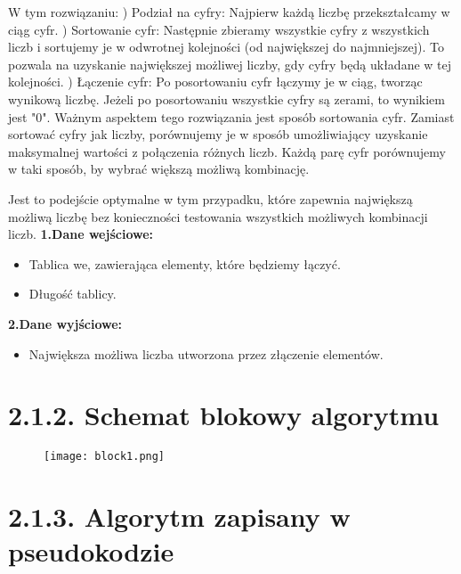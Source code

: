 \documentclass[a4paper,12pt]{article}
\begin{document}
	W tym rozwiązaniu:
	) Podział na cyfry: Najpierw każdą liczbę przekształcamy w ciąg cyfr.
	) Sortowanie cyfr: Następnie zbieramy wszystkie cyfry z wszystkich liczb i sortujemy je w odwrotnej kolejności (od największej do najmniejszej). To pozwala na uzyskanie największej możliwej liczby, gdy cyfry będą układane w tej kolejności.
	) Łączenie cyfr: Po posortowaniu cyfr łączymy je w ciąg, tworząc wynikową liczbę. Jeżeli po posortowaniu wszystkie cyfry są zerami, to wynikiem jest "0".
	\newline
	Ważnym aspektem tego rozwiązania jest sposób sortowania cyfr. Zamiast sortować cyfry jak liczby, porównujemy je w sposób umożliwiający uzyskanie maksymalnej wartości z połączenia różnych liczb. Każdą parę cyfr porównujemy w taki sposób, by wybrać większą możliwą kombinację.
	
	Jest to podejście optymalne w tym przypadku, które zapewnia największą możliwą liczbę bez konieczności testowania wszystkich możliwych kombinacji liczb.
	\newline
	\newline
	\newline
	\hspace{-0.8cm}
	\textbf{1.Dane wejściowe:}
	\begin{itemize}
		\item Tablica we, zawierająca elementy, które będziemy łączyć.
		\item Długość tablicy.
	\end{itemize}
	\textbf{2.Dane wyjściowe:}
	\begin{itemize}
		\item Największa możliwa liczba utworzona przez złączenie elementów.  
	\end{itemize}
	\newpage
	\section{2.1.2. Schemat blokowy algorytmu}
	\begin{figure}[h!]
		\centering\texttt{[image: block1.png]}
	\end{figure}
	\newpage
	\section{2.1.3. Algorytm zapisany w pseudokodzie}
	
\end{document}
